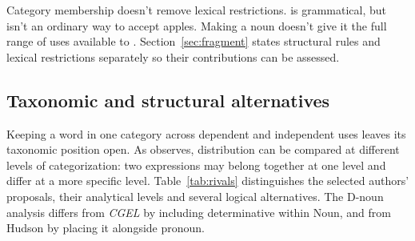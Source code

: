 \documentclass[12pt]{article}
\begin{document}
Category membership doesn't remove lexical restrictions.  is grammatical, but  isn't an ordinary way to accept apples. Making  a noun doesn't give it the full range of uses available to . Section~\ref{sec:fragment} states structural rules and lexical restrictions separately so their contributions can be assessed.

\subsection{Taxonomic and structural alternatives}\label{sec:related}

Keeping a word in one category across dependent and independent uses leaves its taxonomic position open. As \textcite[232--235]{lyons1968} observes, distribution can be compared at different levels of categorization: two expressions may belong together at one level and differ at a more specific level. Table~\ref{tab:rivals} distinguishes the selected authors' proposals, their analytical levels and several logical alternatives. The D-noun analysis differs from \textit{CGEL} by including determinative within Noun, and from Hudson by placing it alongside pronoun.
\end{document}
